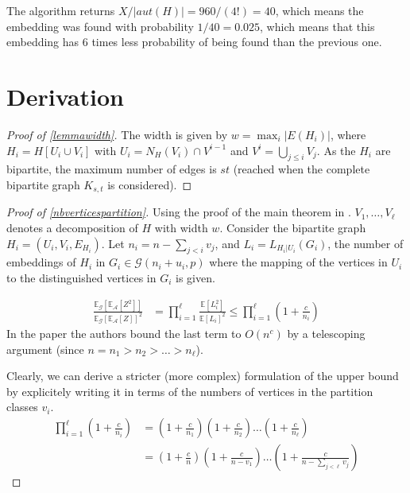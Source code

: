 \documentclass[a4paper,english,12pt,]{scrartcl}
\begin{document}
The algorithm returns $X/|aut(H)|=960/(4!)=40$, which means the embedding was found with probability $1/40=0.025$, which means that this embedding has 6 times less probability of being found than the previous one.

\clearpage
\section{Derivation}
\begin{proof}[Proof of \autoref{lemmawidth}]
The width is given by $w = \max_i |E(H_i)|$, where $H_i=H[U_i \cup V_i]$ with $U_i=N_H(V_i)\cap V^{i-1}$ and $V^i=\bigcup_{j\leq i} V_j$. As the $H_i$ are bipartite, the maximum number of edges is $st$ (reached when the complete bipartite graph $K_{s,t}$ is considered).

\end{proof}


\begin{proof}[Proof of \autoref{nbverticespartition}]
Using the proof of the main theorem in \cite{Furer:2008:ACE:1429791.1429826}. $V_1,\ldots,V_{\ell}$ denotes a decomposition of $H$ with width $w$. Consider the bipartite graph $H_i=(U_i,V_i,E_{H_i})$. Let $n_i=n-\sum_{j<i} v_j$, and $L_i=L_{H_i|U_i}(G_i)$, the number of embeddings of $H_i$ in $G_i\in \mathcal{G}(n_i+u_i,p)$ where the mapping of the vertices in $U_i$ to the distinguished vertices in $G_i$ is given. 

\begin{align*} \label{eq}
 \frac{\mathds{E}_\mathcal{G}[\mathds{E}_\mathcal{A}[Z^2]]}{\mathds{E}_\mathcal{G}[\mathds{E}_\mathcal{A}[Z]]^2}  &= \prod^{\ell}_{i=1} \frac{\mathds{E}[L_i^2]}{\mathds{E}[L_i]^2} \leq \prod^{\ell}_{i=1} (1+\frac{c}{n_i})
\end{align*}
In the paper the authors bound the last term to $O(n^c)$ by a telescoping argument (since $n=n_1>n_2>\ldots > n_{\ell}$).

Clearly, we can derive a stricter (more complex) formulation of the upper bound by explicitely writing it in terms of the numbers of vertices in the partition classes $v_i$.
\begin{align*}
\prod^{\ell}_{i=1} (1+\frac{c}{n_i}) &= (1+\frac{c}{n_1})(1+\frac{c}{n_2}) \ldots (1+\frac{c}{n_\ell}) \\
				     &= (1+\frac{c}{n})(1+\frac{c}{n-v_1}) \ldots (1+\frac{c}{n - \sum_{j<\ell} v_j})
\end{align*}




\end{proof}

\clearpage

\end{document}
